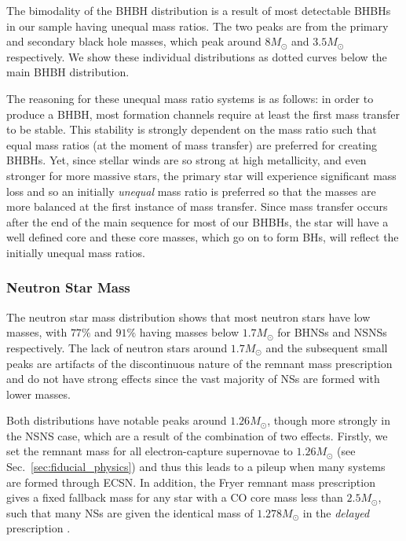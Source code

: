 The bimodality of the BHBH distribution is a result of most detectable BHBHs in our sample having unequal mass ratios. The two peaks are from the primary and secondary black hole masses, which peak around $8 \unit{M_{\odot}}$ and $3.5 \unit{M_{\odot}}$ respectively. We show these individual distributions as dotted curves below the main BHBH distribution.

The reasoning for these unequal mass ratio systems is as follows: in order to produce a BHBH, most formation channels require at least the first mass transfer to be stable. This stability is strongly dependent on the mass ratio such that equal mass ratios (at the moment of mass transfer) are preferred for creating BHBHs. Yet, since stellar winds are so strong at high metallicity, and even stronger for more massive stars, the primary star will experience significant mass loss and so an initially \textit{unequal} mass ratio is preferred so that the masses are more balanced at the first instance of mass transfer. Since mass transfer occurs after the end of the main sequence for most of our BHBHs, the star will have a well defined core and these core masses, which go on to form BHs, will reflect the initially unequal mass ratios.

\subsubsection{Neutron Star Mass}
The neutron star mass distribution shows that most neutron stars have low masses, with $77\%$ and $91\%$ having masses below $1.7 \unit{M_{\odot}}$ for BHNSs and NSNSs respectively. The lack of neutron stars around $1.7 \unit{M_{\odot}}$ and the subsequent small peaks are artifacts of the discontinuous nature of the \citet{Fryer+2012} remnant mass prescription and do not have strong effects since the vast majority of NSs are formed with lower masses.

Both distributions have notable peaks around $1.26 \unit{M_{\odot}}$, though more strongly in the NSNS case, which are a result of the combination of two effects. Firstly, we set the remnant mass for all electron-capture supernovae to $1.26 \unit{M_\odot}$ (see Sec.~\ref{sec:fiducial_physics}) and thus this leads to a pileup when many systems are formed through ECSN. In addition, the Fryer remnant mass prescription gives a fixed fallback mass for any star with a CO core mass less than $2.5 \unit{M_\odot}$, such that many NSs are given the identical mass of $1.278 \unit{M_\odot}$ in the \textit{delayed} prescription \citep[see][Eq.~19]{Fryer+2012}. 

